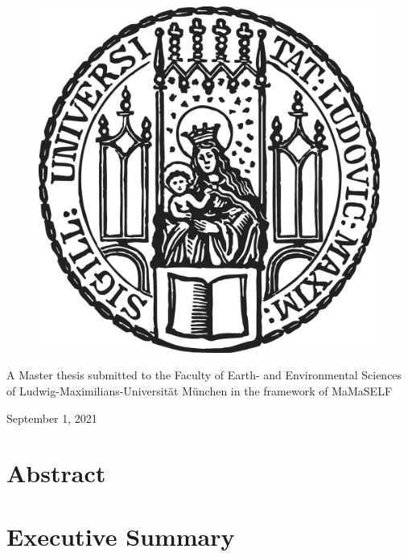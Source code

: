 \documentclass[12pt, oneside]{book}
\begin{document}
\begin{titlepage}
\begin{center}
\vfill %

\begin{figure}[h]
	\centering
	\includegraphics[width=.25\textwidth]{Chapters/Figures/lmu-logo.png}
\end{figure}  

\vfill

A Master thesis submitted to the Faculty
of Earth- and Environmental Sciences\\
of Ludwig-Maximilians-Universität München
in the framework of MaMaSELF

\vspace*{1.5cm}

September 1, 2021 %
\end{center}
\end{titlepage}

\frontmatter 



\chapter{Abstract}

\chapter{Executive Summary}

\end{document}
